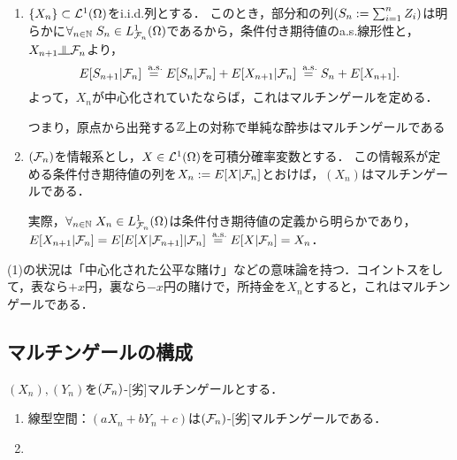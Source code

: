 \documentclass[uplatex,dvipdfmx]{jsreport}
\begin{document}
\begin{example}\mbox{}
    \begin{enumerate}
        \item $\{X_n\}\subset\mathcal{L}^1(\Omega)$をi.i.d.列とする．
        このとき，部分和の列$\left(S_n:=\sum_{i=1}^nZ_i\right)$は明らかに$\forall_{n\in\mathbb{N}}\;S_n\in L^1_{\mathcal{F}_n}(\Omega)$であるから，条件付き期待値のa.s.線形性と，$X_{n+1}\indep\F_n$より，
        \[E[S_{n+1}|\mathcal{F}_n]\overset{\;\mathrm{a.s.}}{=}E[S_n|\mathcal{F}_n]+E[X_{n+1}|\mathcal{F}_n]\overset{\;\mathrm{a.s.}}{=}S_n+E[X_{n+1}].\]
        よって，$X_n$が中心化されていたならば，これはマルチンゲールを定める．

        つまり，原点から出発する$\mathbb{Z}$上の対称で単純な酔歩はマルチンゲールである
        \item $(\mathcal{F}_n)$を情報系とし，$X\in\mathcal{L}^1(\Omega)$を可積分確率変数とする．
        この情報系が定める条件付き期待値の列を$X_n:=E[X|\mathcal{F}_n]$とおけば，$(X_n)$はマルチンゲールである．
        
        実際，$\forall_{n\in\mathbb{N}}\;X_n\in L^1_{\mathcal{F}_n}(\Omega)$は条件付き期待値の定義から明らかであり，
        $E[X_{n+1}|\mathcal{F}_n]=E[E[X|\mathcal{F}_{n+1}]|\mathcal{F}_n]\overset{\;\mathrm{a.s.}}{=}E[X|\mathcal{F}_n]=X_n$．
    \end{enumerate}
    (1)の状況は「中心化された公平な賭け」などの意味論を持つ．コイントスをして，表なら$+x$円，裏なら$-x$円の賭けで，所持金を$X_n$とすると，これはマルチンゲールである．
\end{example}

\subsection{マルチンゲールの構成}

\begin{lemma}[マルチンゲールの保存]
    $(X_n),(Y_n)$を$(\mathcal{F}_n)$-[劣]マルチンゲールとする．
    \begin{enumerate}
        \item 線型空間：$(aX_n+bY_n+c)$は$(\mathcal{F}_n)$-[劣]マルチンゲールである．
        \item 
    \end{enumerate}
\end{lemma}
\end{document}

